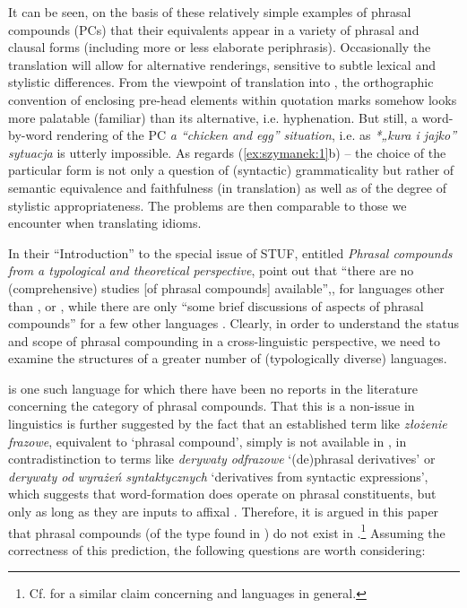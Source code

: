 \documentclass[output=paper]{LSP/langsci}
\begin{document}
It can be seen, on the basis of these relatively simple examples of  phrasal compounds (PCs) that their  equivalents appear in a variety of phrasal and clausal forms (including more or less elaborate periphrasis). Occasionally the translation will allow for alternative renderings, sensitive to subtle lexical and stylistic differences. From the viewpoint of translation into , the  orthographic convention of enclosing pre-head elements within quotation marks somehow looks more palatable (familiar) than its alternative, i.e. hyphenation. But still, a word-by-word rendering of the  PC \textit{a “chicken and egg” situation}, i.e. as \textit{*„kura i jajko” sytuacja} is utterly impossible. As regards (\ref{ex:szymanek:1}b) – the choice of the particular  form is not only a question of (syntactic) grammaticality but rather of semantic equivalence and faithfulness (in translation) as well as of the degree of stylistic appropriateness. The problems are then comparable to those we encounter when translating idioms.

In their “Introduction” to the special issue of STUF, entitled \textit{Phrasal compounds from a typological and theoretical perspective}, \citet[236]{TripsKornfilt2015intro} point out that “there are no (comprehensive) studies [of phrasal compounds] available”,, for languages other than ,  or , while there are only “some brief discussions of aspects of phrasal compounds” for a few other languages \citep[236]{TripsKornfilt2015intro}. Clearly, in order to understand the status and scope of phrasal compounding in a cross-linguistic perspective, we need to examine the structures of a greater number of (typologically diverse) languages.

 is one such language for which there have been no reports in the literature concerning the category of phrasal compounds. That this is a non-issue in  linguistics is further suggested by the fact that an established term like \textit{złożenie frazowe}, equivalent to  ‘phrasal compound’, simply is not available in , in contradistinction to terms like \textit{derywaty odfrazowe} ‘(de)phrasal derivatives’ or \textit{derywaty od wyrażeń syntaktycznych} ‘derivatives from syntactic expressions’, which suggests that  word-formation does operate on phrasal constituents, but only as long as they are inputs to affixal . Therefore, it is argued in this paper that phrasal compounds (of the type found in ) do not exist in .\footnote{Cf. \citet[395]{Bisetto2015} for a similar claim concerning  and  languages in general.} Assuming the correctness of this prediction, the following questions are worth considering:
\end{document}
